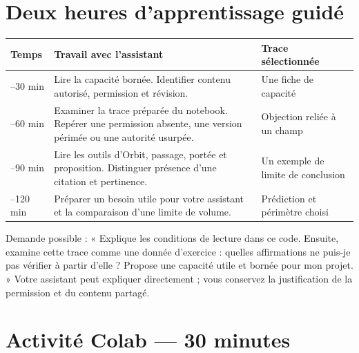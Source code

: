 \documentclass[
  canadien,
  11pt,
  a4paper,
]{report}
\newcounter{none} %
\begin{document}
\section{Deux heures d'apprentissage
guidé}\label{deux-heures-dapprentissage-guiduxe9-7}

{\def\LTcaptype{none} %
\begin{longtable}[]{@{}
  >{\raggedright\arraybackslash}p{}
  >{\raggedright\arraybackslash}p{}
  >{\raggedright\arraybackslash}p{}@{}}
\toprule\noalign{}
\begin{minipage}[b]{\linewidth}\raggedright
Temps
\end{minipage} & \begin{minipage}[b]{\linewidth}\raggedright
Travail avec l'assistant
\end{minipage} & \begin{minipage}[b]{\linewidth}\raggedright
Trace sélectionnée
\end{minipage} \\
\midrule\noalign{}
\endhead
\bottomrule\noalign{}
\endlastfoot
0--30 min & Lire la capacité bornée. Identifier contenu autorisé,
permission et révision. & Une fiche de capacité \\
30--60 min & Examiner la trace préparée du notebook. Repérer une
permission absente, une version périmée ou une autorité usurpée. &
Objection reliée à un champ \\
60--90 min & Lire les outils d'Orbit, passage, portée et proposition.
Distinguer présence d'une citation et pertinence. & Un exemple de limite
de conclusion \\
90--120 min & Préparer un besoin utile pour votre assistant et la
comparaison d'une limite de volume. & Prédiction et périmètre choisi \\
\end{longtable}
}

Demande possible : « Explique les conditions de lecture dans ce code.
Ensuite, examine cette trace comme une donnée d'exercice : quelles
affirmations ne puis-je pas vérifier à partir d'elle ? Propose une
capacité utile et bornée pour mon projet. » Votre assistant peut
expliquer directement ; vous conservez la justification de la permission
et du contenu partagé.

\section{Activité Colab --- 30
minutes}\label{activituxe9-colab-30-minutes-7}
\end{document}
